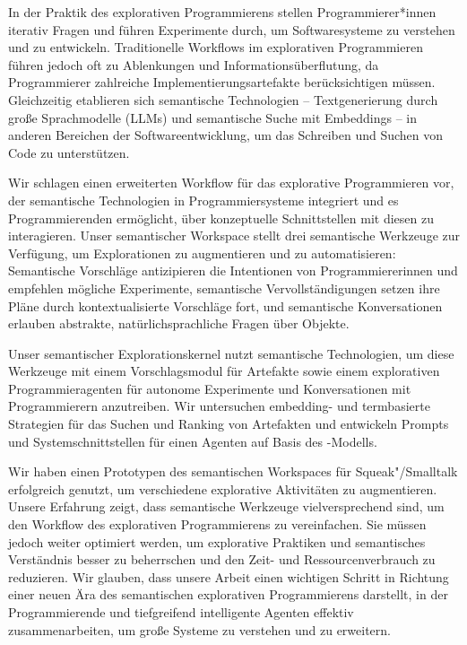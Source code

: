 \begin{zusammenfassung}
	\enlargethispage{2\baselineskip} %
	In der Praktik des explorativen Programmierens stellen Programmierer*innen iterativ Fragen und führen Experimente durch, um Softwaresysteme zu verstehen und zu entwickeln.
	Traditionelle Workflows im explorativen Programmieren führen jedoch oft zu Ablenkungen und Informationsüberflutung, da Programmierer zahlreiche Implementierungsartefakte berücksichtigen müssen.
	Gleichzeitig etablieren sich semantische Technologien -- Textgenerierung durch große Sprachmodelle (LLMs) und semantische Suche mit Embeddings -- in anderen Bereichen der Softwareentwicklung, um das Schreiben und Suchen von Code zu unterstützen.

	Wir schlagen einen erweiterten Workflow für das explorative Programmieren vor, der semantische Technologien in Programmiersysteme integriert und es Programmierenden ermöglicht, über konzeptuelle Schnittstellen mit diesen zu interagieren.
	Unser semantischer Workspace stellt drei semantische Werkzeuge zur Verfügung, um Explorationen zu augmentieren und zu automatisieren:
	Semantische Vorschläge antizipieren die Intentionen von Programmiererinnen und empfehlen mögliche Experimente, semantische Vervollständigungen setzen ihre Pläne durch kontextualisierte Vorschläge fort, und semantische Konversationen erlauben abstrakte, natürlichsprachliche Fragen über Objekte.

	Unser semantischer Explorationskernel nutzt semantische Technologien, um diese Werkzeuge mit einem Vorschlagsmodul für Artefakte sowie einem explorativen Programmieragenten für autonome Experimente und Konversationen mit Programmierern anzutreiben.
	Wir untersuchen embedding- und termbasierte Strategien für das Suchen und Ranking von Artefakten und entwickeln Prompts und Systemschnittstellen für einen Agenten auf Basis des \gptfouro-Modells.

	Wir haben einen Prototypen des semantischen Workspaces für Squeak"/Smalltalk erfolgreich genutzt, um verschiedene explorative Aktivitäten zu augmentieren.
	Unsere Erfahrung zeigt, dass semantische Werkzeuge vielversprechend sind, um den Workflow des explorativen Programmierens zu vereinfachen.
	Sie müssen jedoch weiter optimiert werden, um explorative Praktiken und semantisches Verständnis besser zu beherrschen und den Zeit- und Ressourcenverbrauch zu reduzieren.
	Wir glauben, dass unsere Arbeit einen wichtigen Schritt in Richtung einer neuen Ära des semantischen explorativen Programmierens darstellt, in der Programmierende und tiefgreifend intelligente Agenten effektiv zusammenarbeiten, um große Systeme zu verstehen und zu erweitern.
\end{zusammenfassung}
